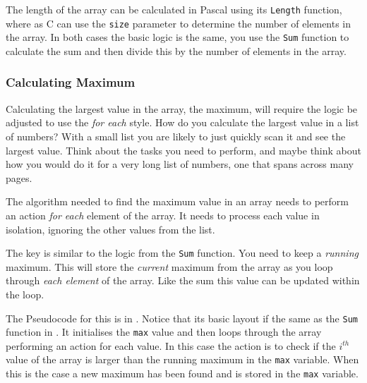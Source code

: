 The length of the array can be calculated in Pascal using its \texttt{Length} function, where as C can use the \texttt{size} parameter to determine the number of elements in the array. In both cases the basic logic is the same, you use the \texttt{Sum} function to calculate the sum and then divide this by the number of elements in the array.





\subsubsection{Calculating Maximum} %
\label{ssub:calculating_maximum}

Calculating the largest value in the array, the maximum, will require the logic be adjusted to use the \emph{for each} style. How do you calculate the largest value in a list of numbers? With a small list you are likely to just quickly scan it and see the largest value. Think about the tasks you need to perform, and maybe think about how you would do it for a very long list of numbers, one that spans across many pages.

The algorithm needed to find the maximum value in an array needs to perform an action \emph{for each} element of the array. It needs to process each value in isolation, ignoring the other values from the list.

The key is similar to the logic from the \texttt{Sum} function. You need to keep a \emph{running} maximum. This will store the \emph{current} maximum from the array as you loop through \emph{each element} of the array. Like the sum this value can be updated within the loop.

The Pseudocode for this is in . Notice that its basic layout if the same as the \texttt{Sum} function in . It initialises the \texttt{max} value and then loops through the array performing an action for each value. In this case the action is to check if the $i^{th}$ value of the array is larger than the running maximum in the \texttt{max} variable. When this is the case a new maximum has been found and is stored in the \texttt{max} variable.

